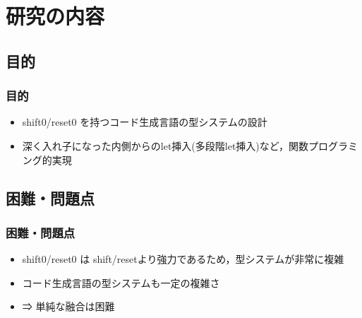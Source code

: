 \documentclass[dvipdfmx,cjk,xcolor=dvipsnames,envcountsect,notheorems,12pt]{beamer}
\theoremstyle{definition}
\begin{document}
\section{研究の内容}
\subsection{目的}

\begin{frame}
  \frametitle{目的}
  \begin{itemize}
  \item shift0/reset0 を持つコード生成言語の型システムの設計
  \item 深く入れ子になった内側からのlet挿入(多段階let挿入)など，関数プログラミング的実現

  \end{itemize}
\end{frame}

\subsection{困難・問題点}

\begin{frame}
  \frametitle{困難・問題点}
  \begin{itemize}
  \item shift0/reset0 は shift/resetより強力であるため，型システムが非常に複雑
  \item コード生成言語の型システムも一定の複雑さ
  \item ⇒ 単純な融合は困難
  \end{itemize}
\end{frame}


\end{document}
